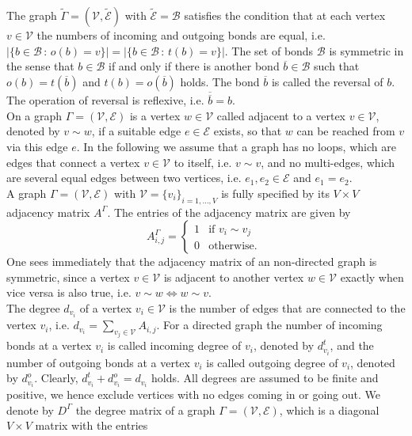 The graph $\widetilde{\Gamma} = (\mathcal{V}, \widetilde{\mathcal{E}})$ with $\widetilde{\mathcal{E}} = \mathcal{B}$ satisfies the condition that at each vertex $v \in \mathcal{V}$ the numbers of incoming and outgoing bonds are equal, i.e. $\left\lvert \{ b \in \mathcal{B} \, \colon \, o(b) = v \} \right\rvert = \left\lvert \{ b \in \mathcal{B} \, \colon \, t(b) = v \} \right\rvert$. The set of bonds $\mathcal{B}$ is symmetric in the sense that $b \in \mathcal{B}$ if and only if there is another bond $\overline{b} \in \mathcal{B}$ such that $o(b) = t(\overline{b})$ and $t(b) = o(\overline{b})$ holds. The bond $\overline{b}$ is called the reversal of $b$. The operation of reversal is reflexive, i.e. $\overline{\overline{b}} = b$. \\
On a graph $\Gamma = (\mathcal{V}, \mathcal{E})$ is a vertex $w \in \mathcal{V}$ called adjacent to a vertex $v \in \mathcal{V}$, denoted by $v \sim w$, if a suitable edge $e \in \mathcal{E}$ exists, so that $w$ can be reached from $v$ via this edge $e$. In the following we assume that a graph has no loops, which are edges that connect a vertex $v \in \mathcal{V}$ to itself, i.e. $v \sim v$, and no multi-edges, which are several equal edges between two vertices, i.e. $e_1, e_2 \in \mathcal{E}$ and $e_1 = e_2$. \\
A graph $\Gamma = (\mathcal{V}, \mathcal{E})$ with $\mathcal{V} = \{v_i\}_{i = 1, \ldots, V}$ is fully specified by its $V \times V$ adjacency matrix $A^{\Gamma}$. The entries of the adjacency matrix are given by
\begin{equation}
    \label{adjacency matrix}
    A^{\Gamma}_{i, j} = \begin{cases} 1 & \text{if } v_i \sim v_j \\ 0 & \text{otherwise. } \end{cases}
\end{equation}
One sees immediately that the adjacency matrix of an non-directed graph is symmetric, since a vertex $v \in \mathcal{V}$ is adjacent to another vertex $w \in \mathcal{V}$ exactly when vice versa is also true, i.e. $v \sim w \Leftrightarrow w \sim v$. \\
The degree $d_{v_i}$ of a vertex $v_i \in \mathcal{V}$ is the number of edges that are connected to the vertex $v_i$, i.e. $d_{v_i} = \sum_{v_j \in \mathcal{V}} A_{i, j}$. For a directed graph the number of incoming bonds at a vertex $v_i$ is called incoming degree of $v_i$, denoted by $d^{t}_{v_i}$, and the number of outgoing bonds at a vertex $v_i$ is called outgoing degree of $v_i$, denoted by $d^{o}_{v_i}$. Clearly, $d^{t}_{v_i} + d^{o}_{v_i} = d_{v_i}$ holds. All degrees are assumed to be finite and positive, we hence exclude vertices with no edges coming in or going out. We denote by $D^{\Gamma}$ the degree matrix of a graph $\Gamma = (\mathcal{V}, \mathcal{E})$, which is a diagonal $V \times V$ matrix with the entries
